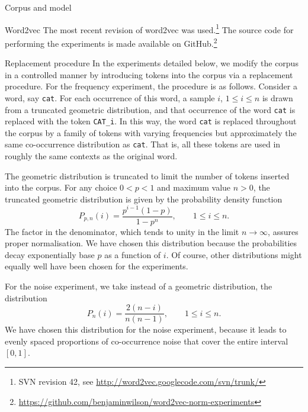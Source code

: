 \documentclass{article} %
\newcommand{\word}[1]{\texttt{#1}}
\begin{document}
\begin{section}{Corpus and model}
\begin{subsection}{Word2vec}
The most recent revision of word2vec was used.\footnote{SVN revision 42,
  see \url{http://word2vec.googlecode.com/svn/trunk/}} The source code
for performing the experiments is made available on
GitHub.\footnote{\url{https://github.com/benjaminwilson/word2vec-norm-experiments}}

\begin{table}
	
	\caption{ Number of words, by frequency band, as observed in the
          unmodified corpus.  }
	\label{word-occurrences-table}
\end{table}
\end{subsection}

\begin{subsection}{Replacement procedure}\label{replacement-procedure}
In the experiments detailed below, we modify the corpus in a controlled
manner by introducing tokens into the corpus via a replacement
procedure.  For the frequency experiment, the procedure is as follows.
Consider a word, say \word{cat}.  For each occurrence of this word, a
sample $i$, $1 \leqslant i \leqslant n$ is drawn from a truncated
geometric distribution, and that occurrence of the word \word{cat} is
replaced with the token \word{CAT\_i}.  In this way, the word \word{cat}
is replaced throughout the corpus by a family of tokens with varying
frequencies but approximately the same co-occurrence distribution as
\word{cat}.  That is, all these tokens are used in roughly the same
contexts as the original word.

The geometric distribution is truncated to limit the number of tokens
inserted into the corpus.  For any choice $0 < p < 1$ and maximum value
$n > 0$, the truncated geometric distribution is given by the
probability density function
\begin{equation} 
\label{distro}
P_{p, n} (i) = \frac{p^{i-1}  (1-p)}{1 - p^n}, \qquad 1
\leqslant i \leqslant n.
\end{equation} 
The factor in the denominator, which tends to unity in the limit $n \to
\infty$, assures proper normalisation.  We have chosen this distribution
because the probabilities decay exponentially base $p$ as a function of
$i$.  Of course, other distributions might equally well have been chosen
for the experiments.

For the noise experiment, we take instead of a geometric distribution,
the distribution
\begin{equation}
\label{distro2} 
P_n (i) = \frac{2 (n-i)}{n(n-1)} , \qquad 1 \leqslant i \leqslant n.
\end{equation} 
We have chosen this distribution for the noise experiment, because it
leads to evenly spaced proportions of co-occurrence noise that cover the entire interval
$[0,1]$.
\end{subsection}
\end{section}
\end{document}
